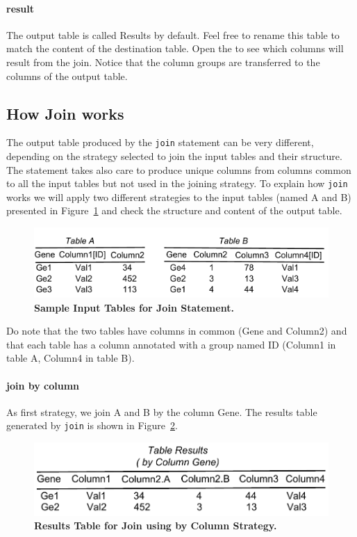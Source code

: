 \paragraph{result}
The output table is called Results by default. Feel free to rename this table to match the content of the destination table. Open the \inspectorTabIcon{} to see which columns will result from the join. Notice that the column groups are transferred to the columns of the output table.

\subsection{How Join works}
The output table produced by the \texttt{join} statement can be very different, depending on the strategy selected to join the input tables and their structure. The statement takes also care to produce unique columns from columns common to all the input tables but not used in the joining strategy. To explain how \texttt{join} works we will apply two different strategies to the input tables (named A and B) presented in Figure~\ref{fig:SourceTablesJoinStatement} and check the structure and content of the output table.
\begin{figure}[h!tbp]
  \centering
  \includegraphics[width=\figWidthNarrow]{figures/JoinA-B-SourceTable.pdf}
\caption[Sample input tables for Join Statement.]{\textbf{Sample Input Tables for Join Statement.}}
\label{fig:SourceTablesJoinStatement}
\end{figure}

Do note that the two tables have columns in common (Gene and Column2) and that each table has a column annotated with a group named ID (Column1 in table A, Column4 in table B).

\paragraph{join by column}
As first strategy, we join A and B by the column Gene. The results table generated by \texttt{join} is shown in Figure~\ref{fig:ResultsTableJoinByColumnStatement}. 

\begin{figure}[h!tbp]
  \centering
  \includegraphics[width=\figWidthNarrow]{figures/JoinA-BbyColumn.pdf}
\caption[Results Table for Join using by Column Strategy.]{\textbf{Results Table for Join using by Column Strategy.}}
\label{fig:ResultsTableJoinByColumnStatement}
\end{figure}


